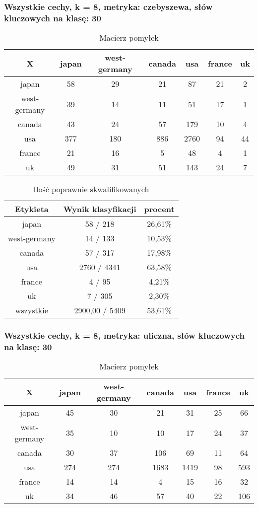 \documentclass{classrep}
\begin{document}
\subsubsection{Wszystkie cechy, k = 8, metryka: czebyszewa, słów kluczowych na klasę: 30}
\begin{table}[h]
\centering
\begin{tabular}{|c|c|c|c|c|c|c|}
\hline
 X  & japan & west-germany & canada & usa & france & uk\\
\hline
japan & 58 & 29 & 21 & 87 & 21 & 2\\
\hline
west-germany & 39 & 14 & 11 & 51 & 17 & 1\\
\hline
canada & 43 & 24 & 57 & 179 & 10 & 4\\
\hline
usa & 377 & 180 & 886 & 2760 & 94 & 44\\
\hline
france & 21 & 16 & 5 & 48 & 4 & 1\\
\hline
uk & 49 & 31 & 51 & 143 & 24 & 7\\
\hline
\end{tabular}
\caption{Macierz pomyłek}\end{table}

\begin{table}[h]
\centering
\begin{tabular}{|c|c|c|}
\hline
Etykieta & Wynik klasyfikacji & procent\\
\hline
japan & 58 / 218 & 26,61\%\\
\hline
west-germany & 14 / 133 & 10,53\%\\
\hline
canada & 57 / 317 & 17,98\%\\
\hline
usa & 2760 / 4341 & 63,58\%\\
\hline
france & 4 / 95 & 4,21\%\\
\hline
uk & 7 / 305 & 2,30\%\\
\hline
wszystkie & 2900,00 / 5409 & 53,61\%\\
\hline
\end{tabular}
\caption{Ilość poprawnie skwalifikowanych}\end{table}



\newpage
\subsubsection{Wszystkie cechy, k = 8, metryka: uliczna, słów kluczowych na klasę: 30}
\begin{table}[h]
\centering
\begin{tabular}{|c|c|c|c|c|c|c|}
\hline
 X  & japan & west-germany & canada & usa & france & uk\\
\hline
japan & 45 & 30 & 21 & 31 & 25 & 66\\
\hline
west-germany & 35 & 10 & 10 & 17 & 24 & 37\\
\hline
canada & 30 & 37 & 106 & 69 & 11 & 64\\
\hline
usa & 274 & 274 & 1683 & 1419 & 98 & 593\\
\hline
france & 14 & 14 & 4 & 15 & 16 & 32\\
\hline
uk & 34 & 46 & 57 & 40 & 22 & 106\\
\hline
\end{tabular}
\caption{Macierz pomyłek}\end{table}
\end{document}
